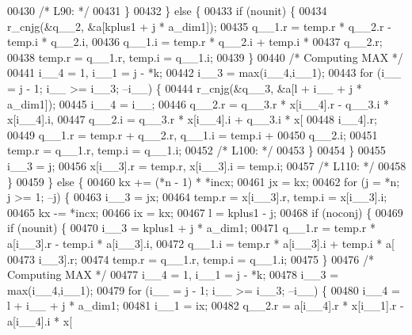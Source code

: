 \begin{DoxyCode}
00430 \textcolor{comment}{/* L90: */}
00431             \}
00432             \} \textcolor{keywordflow}{else} \{
00433             \textcolor{keywordflow}{if} (nounit) \{
00434                 r\_cnjg(&q\_\_2, &a[kplus1 + j * a\_dim1]);
00435                 q\_\_1.r = temp.r * q\_\_2.r - temp.i * q\_\_2.i, 
00436                     q\_\_1.i = temp.r * q\_\_2.i + temp.i * 
00437                     q\_\_2.r;
00438                 temp.r = q\_\_1.r, temp.i = q\_\_1.i;
00439             \}
00440 \textcolor{comment}{/* Computing MAX */}
00441             i\_\_4 = 1, i\_\_1 = j - *k;
00442             i\_\_3 = max(i\_\_4,i\_\_1);
00443             \textcolor{keywordflow}{for} (i\_\_ = j - 1; i\_\_ >= i\_\_3; --i\_\_) \{
00444                 r\_cnjg(&q\_\_3, &a[l + i\_\_ + j * a\_dim1]);
00445                 i\_\_4 = i\_\_;
00446                 q\_\_2.r = q\_\_3.r * x[i\_\_4].r - q\_\_3.i * x[i\_\_4].i, 
00447                     q\_\_2.i = q\_\_3.r * x[i\_\_4].i + q\_\_3.i * x[
00448                     i\_\_4].r;
00449                 q\_\_1.r = temp.r + q\_\_2.r, q\_\_1.i = temp.i + 
00450                     q\_\_2.i;
00451                 temp.r = q\_\_1.r, temp.i = q\_\_1.i;
00452 \textcolor{comment}{/* L100: */}
00453             \}
00454             \}
00455             i\_\_3 = j;
00456             x[i\_\_3].r = temp.r, x[i\_\_3].i = temp.i;
00457 \textcolor{comment}{/* L110: */}
00458         \}
00459         \} \textcolor{keywordflow}{else} \{
00460         kx += (*n - 1) * *incx;
00461         jx = kx;
00462         \textcolor{keywordflow}{for} (j = *n; j >= 1; --j) \{
00463             i\_\_3 = jx;
00464             temp.r = x[i\_\_3].r, temp.i = x[i\_\_3].i;
00465             kx -= *incx;
00466             ix = kx;
00467             l = kplus1 - j;
00468             \textcolor{keywordflow}{if} (noconj) \{
00469             \textcolor{keywordflow}{if} (nounit) \{
00470                 i\_\_3 = kplus1 + j * a\_dim1;
00471                 q\_\_1.r = temp.r * a[i\_\_3].r - temp.i * a[i\_\_3].i, 
00472                     q\_\_1.i = temp.r * a[i\_\_3].i + temp.i * a[
00473                     i\_\_3].r;
00474                 temp.r = q\_\_1.r, temp.i = q\_\_1.i;
00475             \}
00476 \textcolor{comment}{/* Computing MAX */}
00477             i\_\_4 = 1, i\_\_1 = j - *k;
00478             i\_\_3 = max(i\_\_4,i\_\_1);
00479             \textcolor{keywordflow}{for} (i\_\_ = j - 1; i\_\_ >= i\_\_3; --i\_\_) \{
00480                 i\_\_4 = l + i\_\_ + j * a\_dim1;
00481                 i\_\_1 = ix;
00482                 q\_\_2.r = a[i\_\_4].r * x[i\_\_1].r - a[i\_\_4].i * x[

\end{DoxyCode}
